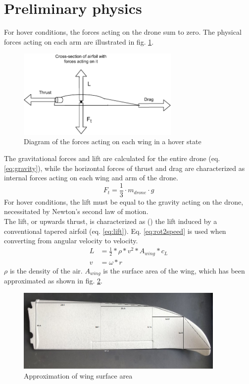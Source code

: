 \section{Preliminary physics}\label{sec:preliminaryphysics}
For hover conditions, the forces acting on the drone sum to zero. The physical forces acting on each arm are illustrated in fig. \ref{fig:kraftdiagram}.
\begin{figure}[h!]
    \centering
    \includegraphics[width=0.7\textwidth]{figures/control_loops/hover_kraftdiagram.pdf}
    \caption{Diagram of the forces acting on each wing in a hover state}
    \label{fig:kraftdiagram}
\end{figure}
The gravitational forces and lift are calculated for the entire drone (eq. \ref{eq:gravity}), while the horizontal forces of thrust and drag are characterized as internal forces acting on each wing and arm of the drone.  
\begin{equation}
\label{eq:gravity}
    F_t = \frac{1}{3}\cdot m_{drone} \cdot g 
\end{equation}
For hover conditions, the lift must be equal to the gravity acting on the drone, necessitated by Newton's second law of motion. \\
The lift, or upwards thrust, is characterized as (\cite{flight_physics}) the lift induced by a conventional tapered airfoil (eq. \ref{eq:lift}). Eq. \ref{eq:rot2speed} is used when converting from angular velocity to velocity.
\begin{align}
    \label{eq:lift}
    L &= \frac{1}{2}*\rho*v^2*A_{wing}*c_L\\
    v &= \omega * r \label{eq:rot2speed}
\end{align}
$\rho$ is the density of the air.
$A_{wing}$ is the surface area of the wing, which has been approximated as shown in fig. \ref{fig:wing_area_approx}.
\begin{figure}[h!]
    \centering
    \includegraphics[width=0.9\textwidth]{figures/control_loops/wing_area_approx.jpg}
    \caption{Approximation of wing surface area}
    \label{fig:wing_area_approx}
\end{figure}\\ 
